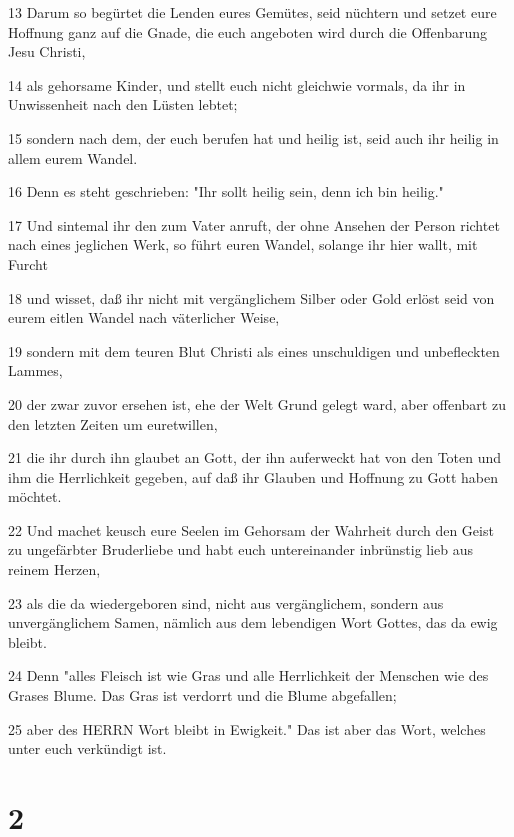 \par 13 Darum so begürtet die Lenden eures Gemütes, seid nüchtern und setzet eure Hoffnung ganz auf die Gnade, die euch angeboten wird durch die Offenbarung Jesu Christi,
\par 14 als gehorsame Kinder, und stellt euch nicht gleichwie vormals, da ihr in Unwissenheit nach den Lüsten lebtet;
\par 15 sondern nach dem, der euch berufen hat und heilig ist, seid auch ihr heilig in allem eurem Wandel.
\par 16 Denn es steht geschrieben: "Ihr sollt heilig sein, denn ich bin heilig."
\par 17 Und sintemal ihr den zum Vater anruft, der ohne Ansehen der Person richtet nach eines jeglichen Werk, so führt euren Wandel, solange ihr hier wallt, mit Furcht
\par 18 und wisset, daß ihr nicht mit vergänglichem Silber oder Gold erlöst seid von eurem eitlen Wandel nach väterlicher Weise,
\par 19 sondern mit dem teuren Blut Christi als eines unschuldigen und unbefleckten Lammes,
\par 20 der zwar zuvor ersehen ist, ehe der Welt Grund gelegt ward, aber offenbart zu den letzten Zeiten um euretwillen,
\par 21 die ihr durch ihn glaubet an Gott, der ihn auferweckt hat von den Toten und ihm die Herrlichkeit gegeben, auf daß ihr Glauben und Hoffnung zu Gott haben möchtet.
\par 22 Und machet keusch eure Seelen im Gehorsam der Wahrheit durch den Geist zu ungefärbter Bruderliebe und habt euch untereinander inbrünstig lieb aus reinem Herzen,
\par 23 als die da wiedergeboren sind, nicht aus vergänglichem, sondern aus unvergänglichem Samen, nämlich aus dem lebendigen Wort Gottes, das da ewig bleibt.
\par 24 Denn "alles Fleisch ist wie Gras und alle Herrlichkeit der Menschen wie des Grases Blume. Das Gras ist verdorrt und die Blume abgefallen;
\par 25 aber des HERRN Wort bleibt in Ewigkeit." Das ist aber das Wort, welches unter euch verkündigt ist.

\chapter{2}

